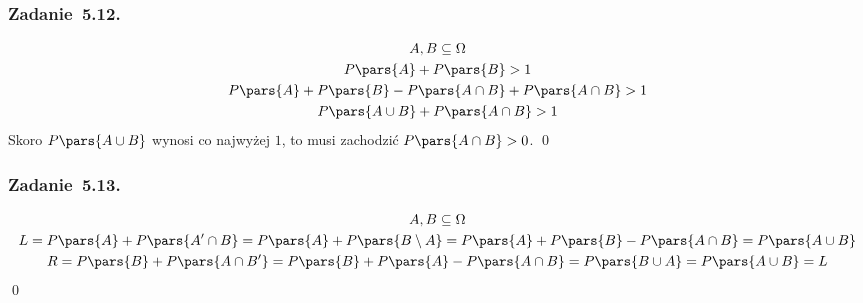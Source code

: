 \subsubsection*{Zadanie~5.12.}
\begin{gather*}
    A, B \subseteq \Omega\\
    P\pars{A} + P\pars{B} > 1\\
    P\pars{A} + P\pars{B} - P\pars{A \cap B} + P\pars{A \cap B} > 1\\
    P\pars{A \cup B} + P\pars{A \cap B} > 1
\end{gather*}
Skoro \(P\pars{A \cup B}\) wynosi co najwyżej \(1\), to musi zachodzić \(P\pars{A \cap B} > 0\).
\qed
\subsubsection*{Zadanie~5.13.}
\begin{gather*}
    A, B \subseteq \Omega\\
    L = P\pars{A} + P\pars{A' \cap B}
        = P\pars{A} + P\pars{B \setminus A}
        = P\pars{A} + P\pars{B} - P\pars{A \cap B}
        = P\pars{A \cup B}\\
    R = P\pars{B} + P\pars{A \cap B'}
        = P\pars{B} + P\pars{A} - P\pars{A \cap B}
        = P\pars{B \cup A}
        = P\pars{A \cup B} = L
\end{gather*}
\qed
